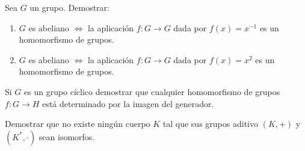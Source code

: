 \begin{ejercicio}\label{ej:2.37}
    Sea $G$ un grupo. Demostrar:
    \begin{enumerate}
        \item $G$ es abeliano $\iff$ la aplicación $f : G \to G$ dada por $f(x) = x^{-1}$ es un homomorfismo de grupos.
        \item $G$ es abeliano $\iff$ la aplicación $f : G \to G$ dada por $f(x) = x^2$ es un homomorfismo de grupos.
    \end{enumerate}
\end{ejercicio}


\begin{ejercicio}\label{ej:2.38}
    Si $G$ es un grupo cíclico demostrar que cualquier homomorfismo de grupos $f : G \to H$ está determinado por la imagen del generador.
\end{ejercicio}

\begin{ejercicio}\label{ej:2.39}
    Demostrar que no existe ningún cuerpo $K$ tal que sus grupos aditivo $(K, +)$ y $(K^{\ast}, \cdot)$ sean isomorfos.
\end{ejercicio}
